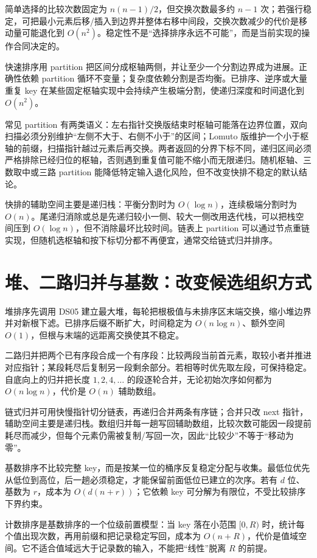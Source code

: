 \documentclass[UTF8,fontset=none,11pt,a4paper]{ctexart}
\begin{document}
简单选择的比较次数固定为 $n(n-1)/2$，但交换次数最多约 $n-1$ 次；若强行稳定，可把最小元素后移/插入到边界并整体右移中间段，交换次数减少的代价是移动量可能退化到 $O(n^2)$。稳定性不是“选择排序永远不可能”，而是当前实现的操作合同决定的。

快速排序用 partition 把区间分成枢轴两侧，并让至少一个分割边界成为进展。正确性依赖 partition 循环不变量；复杂度依赖分割是否均衡。已排序、逆序或大量重复 key 在某些固定枢轴实现中会持续产生极端分割，使递归深度和时间退化到 $O(n^2)$。

常见 partition 有两类语义：左右指针交换版结束时枢轴可能落在边界位置，双向扫描必须分别维护“左侧不大于、右侧不小于”的区间；Lomuto 版维护一个小于枢轴的前缀，扫描指针越过元素后再交换。两者返回的分界下标不同，递归区间必须严格排除已经归位的枢轴，否则遇到重复值可能不缩小而无限递归。随机枢轴、三数取中或三路 partition 能降低特定输入退化风险，但不改变快排不稳定的默认结论。

快排的辅助空间主要是递归栈：平衡分割时为 $O(\log n)$，连续极端分割时为 $O(n)$。尾递归消除或总是先递归较小一侧、较大一侧改用迭代栈，可以把栈空间压到 $O(\log n)$，但不消除最坏比较时间。链表上 partition 可以通过节点重链实现，但随机选枢轴和按下标切分都不再便宜，通常交给链式归并排序。

\section{堆、二路归并与基数：改变候选组织方式}
堆排序先调用 DS05 建立最大堆，每轮把根极值与未排序区末端交换，缩小堆边界并对新根下滤。已排序后缀不断扩大，时间稳定为 $O(n\log n)$、额外空间 $O(1)$，但根与末端的远距离交换使其不稳定。

二路归并把两个已有序段合成一个有序段：比较两段当前首元素，取较小者并推进对应指针；某段耗尽后复制另一段剩余部分。若相等时优先取左段，可保持稳定。自底向上的归并把长度 $1,2,4,\ldots$ 的段逐轮合并，无论初始次序如何都为 $O(n\log n)$，代价是 $O(n)$ 辅助数组。

链式归并可用快慢指针切分链表，再递归合并两条有序链；合并只改 next 指针，辅助空间主要是递归栈。数组归并每一趟写回辅助数组，比较次数可能因一段提前耗尽而减少，但每个元素仍需被复制/写回一次，因此“比较少”不等于“移动为零”。

基数排序不比较完整 key，而是按某一位的桶序反复稳定分配与收集。最低位优先从低位到高位，后一趟必须稳定，才能保留前面低位已建立的次序。若有 $d$ 位、基数为 $r$，成本为 $O(d(n+r))$；它依赖 key 可分解为有限位，不受比较排序下界约束。

计数排序是基数排序的一个位级前置模型：当 key 落在小范围 $[0,R)$ 时，统计每个值出现次数，再用前缀和把记录稳定写回，成本为 $O(n+R)$，代价是值域空间。它不适合值域远大于记录数的输入，不能把“线性”脱离 $R$ 的前提。
\end{document}
